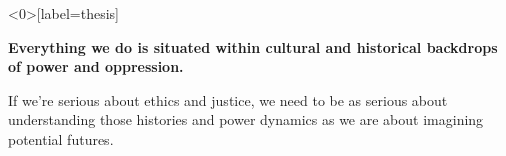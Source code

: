 \documentclass[presentation]{subfiles}
\begin{document}
\begin{frame}<0>[label=thesis] %
  \begin{center}
    \alert<+>{}
    {\Large \bfseries Everything we do is situated within cultural and historical backdrops of power and oppression.}

    \vspace{1em}

    {\large If we're serious about ethics and justice, we need to be as serious
        about \alert<+>{understanding those histories and power dynamics}
        as we are
        about \alert<+>{imagining potential futures}.}

    \vspace{2em}




  \end{center}
\end{frame}








\begin{frame}[standout]
\end{frame}


\end{document}
